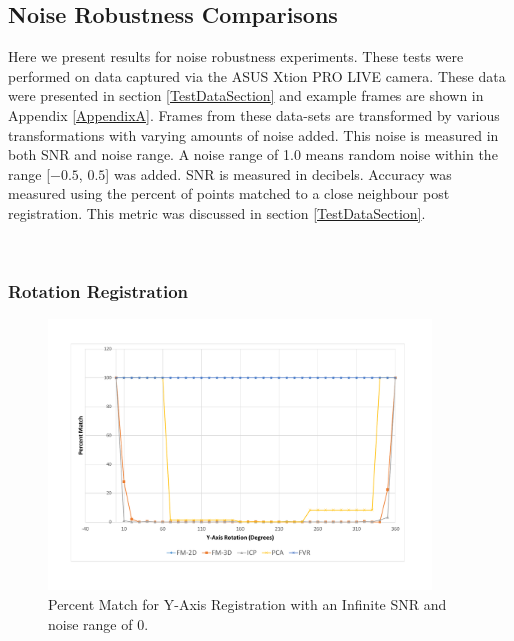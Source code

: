 
\subsection{Noise Robustness Comparisons}


Here we present results for noise robustness experiments. These tests were performed on data captured via the ASUS Xtion PRO LIVE camera. These data were presented in section \ref{TestDataSection} and example frames are shown in Appendix \ref{AppendixA}. Frames from these data-sets are transformed by various transformations with varying amounts of noise added. This noise is measured in both SNR and noise range. A noise range of 1.0 means random noise within the range [$-0.5$, $0.5$] was added. SNR is measured in decibels. Accuracy was measured using the percent of points matched to a close neighbour post registration. This metric was discussed in section \ref{TestDataSection}. 



\begin{table}[!htb]
\centering
{}
\\
\caption{Average percent matched registration results for data rotated about the y-axis from 0 to 360 degrees under varying noise conditions.}
\label{table:YRNoiseT}
\end{table}


\subsubsection{Rotation Registration}

\begin{figure}[!htb]
\centering
\includegraphics[width=4.0in]{images/results/noise/YRNoise0}
\caption{Percent Match for Y-Axis Registration with an Infinite SNR and noise range of $0$.}
\label{fig:YRNoise0}
\end{figure}

